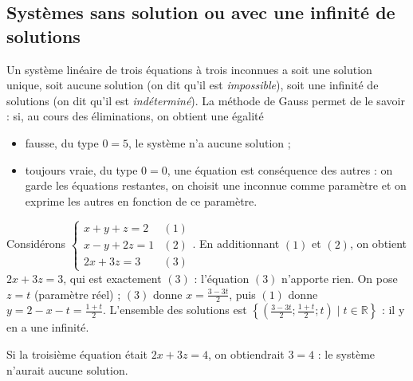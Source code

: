             \subsection{Syst\`emes sans solution ou avec une infinit\'e de solutions}
            Un syst\`eme lin\'eaire de trois \'equations \`a trois inconnues a soit une solution unique,
            soit aucune solution (on dit qu'il est \emph{impossible}), soit une infinit\'e de solutions (on dit qu'il est \emph{ind\'etermin\'e}).
            La m\'ethode de Gauss permet de le savoir : si, au cours des \'eliminations, on obtient une \'egalit\'e
            \begin{itemize}
                  \item fausse, du type $0 = 5$, le syst\`eme n'a aucune solution ;
                  \item toujours vraie, du type $0 = 0$, une \'equation est cons\'equence des autres : on garde les \'equations restantes,
                        on choisit une inconnue comme param\`etre et on exprime les autres en fonction de ce param\`etre.
            \end{itemize}
            \begin{ex}
                  Consid\'erons
                  $\left\lbrace
                        \begin{array}{lc}
                              x + y + z = 2 & (1) \\
                              x - y + 2 z = 1 & (2) \\
                              2 x + 3 z = 3 & (3)
                        \end{array}
                  \right.$.
                  En additionnant $(1)$ et $(2)$, on obtient $2x + 3z = 3$, qui est exactement $(3)$ :
                  l'\'equation $(3)$ n'apporte rien. On pose $z = t$ (param\`etre r\'eel) ; $(3)$ donne $x = \frac{3 - 3t}{2}$,
                  puis $(1)$ donne $y = 2 - x - t = \frac{1 + t}{2}$.
                  L'ensemble des solutions est
                  $\left\lbrace \left( \frac{3 - 3t}{2} ; \frac{1 + t}{2} ; t \right) \mid t \in \mathbb{R} \right\rbrace$ :
                  il y en a une infinit\'e.
                  
                  Si la troisi\`eme \'equation \'etait $2x + 3z = 4$, on obtiendrait $3 = 4$ : le syst\`eme n'aurait aucune solution.
            \end{ex}
